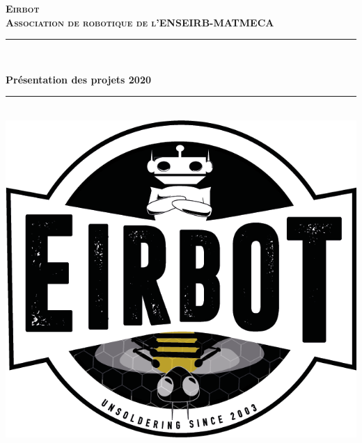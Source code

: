 \documentclass[a4paper,10pt]{article}
\newcommand{\HRule}{\rule{\linewidth}{0.1mm}}
\begin{document}
\begin{spacing}{1.5}
\graphicspath{{image/}}
  \begin{titlepage}
\begin{sffamily}
\begin{center}
\textbf{\textsc{\LARGE Eirbot \\ Association de robotique de
    l'ENSEIRB-MATMECA}}\\[1cm]
\HRule \\[0.2cm]
       {\Huge \bfseries \fontsize{30}{30}\selectfont Présentation des projets 2020 \\
       \HRule \\[0.5cm]

       \includegraphics[scale=0.4]{LogoEirbot.png}
       \vfill}
  \end{center}
  \end{sffamily}
\end{titlepage}
\setcounter{tocdepth}{2}
\newpage
\pagestyle{fancy}
\lhead{}
\rhead{\thepage}
\lfoot{}
\cfoot{}

\end{spacing}
\end{document}
